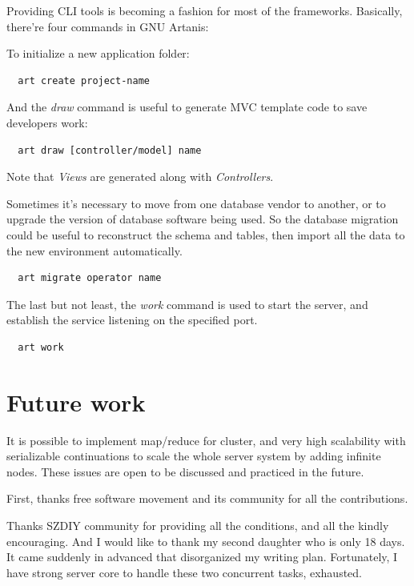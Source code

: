 \documentclass[numbers,numberedpars]{sigplanconf}
\begin{document}
Providing CLI tools is becoming a fashion for most of the frameworks.
Basically, there're four commands in GNU Artanis:

To initialize a new application folder:
\begin{lstlisting}
  art create project-name
\end{lstlisting}

And the {\it draw} command is useful to generate MVC template code to save developers work:
\begin{lstlisting}
  art draw [controller/model] name
\end{lstlisting}
Note that {\it Views} are generated along with {\it Controllers}.

Sometimes it's necessary to move from one database vendor to another, or to upgrade the version of database software being used.
So the database migration could be useful to reconstruct the schema and tables, then import all the data to the new environment automatically.
\begin{lstlisting}
  art migrate operator name
\end{lstlisting}

The last but not least, the {\it work} command is used to start the server, and establish the service listening on the specified port.
\begin{lstlisting}
  art work
\end{lstlisting}

\section{Future work}

It is possible to implement map/reduce for cluster, and very high scalability with serializable continuations to scale the whole server
system by adding infinite nodes. These issues are open to be discussed and practiced in the future.

\acks

First, thanks free software movement and its community for all the contributions.

Thanks SZDIY community for providing all the conditions, and all the kindly encouraging. And I would like to thank my second daughter who
is only 18 days. It came suddenly in advanced that disorganized my writing plan. Fortunately, I have strong server core to handle these two
concurrent tasks, exhausted.





\softraggedright


\end{document}
